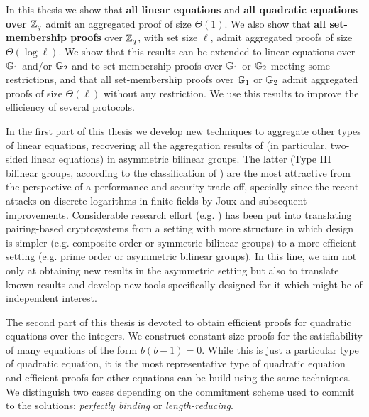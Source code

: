 In this thesis we show that \textbf{all linear equations} and \textbf{all quadratic equations over $\mathbb{Z}_q$} admit an aggregated proof of size $\Theta(1)$. We also show that \textbf{all set-membership proofs} over $\mathbb{Z}_q$, with set size $\ell$, admit aggregated proofs of size $\Theta(\log \ell)$. We show that this results can be extended to linear equations over $\mathbb{G}_1$ and/or $\mathbb{G}_2$ and to set-membership proofs over $\mathbb{G}_1$ or $\mathbb{G}_2$ meeting some restrictions, and that all set-membership proofs over $\mathbb{G}_1$ or $\mathbb{G}_2$ admit aggregated proofs of size $\Theta(\ell)$ without any restriction. We use this results to improve the efficiency of several protocols. 

In the first part of this thesis we develop new techniques to aggregate
other types of linear equations, recovering all the aggregation results of \cite{C:JutRoy14} (in particular, two-sided linear equations) in asymmetric bilinear groups. The latter (Type III bilinear groups, according to the classification of \cite{DAM:GalPatSma08}) are the most 
attractive 
from the perspective of a performance and security trade off, specially since the recent attacks on discrete logarithms in finite fields by Joux \cite{SAC:Joux13} and subsequent improvements. Considerable research effort 
(e.g. \cite{C:AGOT14a,EC:Freeman10})
has been put into translating pairing-based cryptosystems from a setting with more structure in which design is simpler (e.g. composite-order or symmetric bilinear groups) to a more efficient setting (e.g. prime order or asymmetric bilinear groups). In this line, we aim not only at obtaining new results in the asymmetric setting but also to translate known results and develop new tools specifically designed for it which might be of independent interest.

The second part of this thesis is devoted to obtain efficient proofs for quadratic equations over the integers. We construct constant size proofs for the satisfiability of many equations of the form $b(b-1)=0$. While this is just a particular type of quadratic equation, it is the most representative type of quadratic equation and efficient proofs for other equations can be build using the same techniques. We distinguish two cases depending on the commitment scheme used to commit to the solutions: \emph{perfectly binding} or \emph{length-reducing}.

